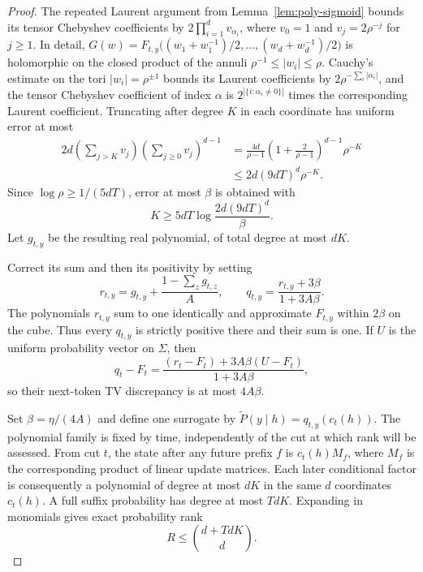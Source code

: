 \documentclass[11pt]{article}
\theoremstyle{definition}
\theoremstyle{remark}
\begin{document}
\begin{proof}
The repeated Laurent argument from Lemma~\ref{lem:poly-sigmoid} bounds its tensor Chebyshev coefficients by
$2\prod_{i=1}^d v_{\alpha_i}$, where $v_0=1$ and $v_j=2\rho^{-j}$ for $j\ge1$. In detail, $G(w)=F_{t,y}\bigl((w_1+w_1^{-1})/2,\ldots,(w_d+w_d^{-1})/2\bigr)$ is holomorphic on the closed product of the annuli $\rho^{-1}\le|w_i|\le\rho$. Cauchy's estimate on the tori $|w_i|=\rho^{\pm1}$ bounds its Laurent coefficients by $2\rho^{-\sum_i|\alpha_i|}$, and the tensor Chebyshev coefficient of index $\alpha$ is $2^{|\{i:\alpha_i\ne0\}|}$ times the corresponding Laurent coefficient. Truncating after degree $K$ in each coordinate has uniform error at most
\[
\begin{split}
2d\left(\sum_{j>K}v_j\right)
\left(\sum_{j\ge0}v_j\right)^{d-1}
&=\frac{4d}{\rho-1}
\left(1+\frac2{\rho-1}\right)^{d-1}\rho^{-K}\\
&\le2d(9dT)^d\rho^{-K}.
\end{split}
\]
Since $\log\rho\ge1/(5dT)$, error at most $\beta$ is obtained with
\[
K\ge5dT\log\frac{2d(9dT)^d}{\beta}.
\]
Let $g_{t,y}$ be the resulting real polynomial, of total degree at most $dK$.

Correct its sum and then its positivity by setting
\[
r_{t,y}=g_{t,y}+\frac{1-\sum_zg_{t,z}}A,\qquad
q_{t,y}=\frac{r_{t,y}+3\beta}{1+3A\beta}.
\]
The polynomials $r_{t,y}$ sum to one identically and approximate $F_{t,y}$ within $2\beta$ on the cube. Thus every $q_{t,y}$ is strictly positive there and their sum is one. If $U$ is the uniform probability vector on $\Sigma$, then
\[
q_t-F_t=
\frac{(r_t-F_t)+3A\beta(U-F_t)}{1+3A\beta},
\]
so their next-token TV discrepancy is at most $4A\beta$.

Set $\beta=\eta/(4A)$ and define one surrogate by
$\widetilde P(y\mid h)=q_{t,y}(c_t(h))$. The polynomial family is fixed by time, independently of the cut at which rank will be assessed. From cut $t$, the state after any future prefix $f$ is $c_t(h)M_f$, where $M_f$ is the corresponding product of linear update matrices. Each later conditional factor is consequently a polynomial of degree at most $dK$ in the same $d$ coordinates $c_t(h)$. A full suffix probability has degree at most $TdK$. Expanding in monomials gives exact probability rank
\[
R\le \binom{d+TdK}{d}.
\]


\end{proof}
\end{document}
